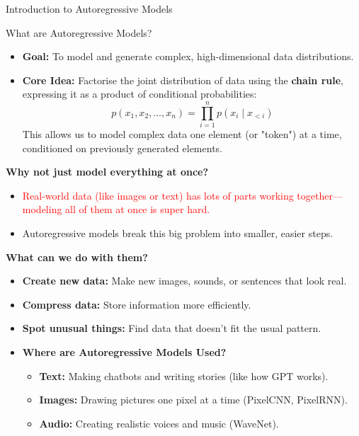\begin{frame}[allowframebreaks]{}
    \centering
    \LARGE Introduction to Autoregressive Models
\end{frame}

\begin{frame}[allowframebreaks]{What are Autoregressive Models?}
    \begin{itemize}
        \item \textbf{Goal:} To model and generate complex, high-dimensional data distributions.
        \item \textbf{Core Idea:} Factorise the joint distribution of data using the \textbf{chain rule}, expressing it as a product of conditional probabilities:
        \[
        p(x_1, x_2, \ldots, x_n) = \prod_{i=1}^n p(x_i \mid x_{<i})
        \]
        This allows us to model complex data one element (or "token") at a time, conditioned on previously generated elements.
    \end{itemize}

    \framebreak
    
    \textbf{Why not just model everything at once?}
        \begin{itemize}
            \item \textcolor{red}{Real-world data (like images or text) has lots of parts working together—modeling all of them at once is super hard.}
            \item \textcolor[rgb]{0,0.5,0}{Autoregressive models break this big problem into smaller, easier steps.}
        \end{itemize}
    \vspace{2em}
    \textbf{What can we do with them?}
        \begin{itemize}
            \item \textbf{Create new data:} Make new images, sounds, or sentences that look real.
            \item \textbf{Compress data:} Store information more efficiently.
            \item \textbf{Spot unusual things:} Find data that doesn’t fit the usual pattern.
        \end{itemize}

    \framebreak

    \begin{itemize}
        \item \textbf{Where are Autoregressive Models Used?}
            \begin{itemize}
                \item \textbf{Text:} Making chatbots and writing stories (like how GPT works).
                \item \textbf{Images:} Drawing pictures one pixel at a time (PixelCNN, PixelRNN).
                \item \textbf{Audio:} Creating realistic voices and music (WaveNet).
            \end{itemize}
    \end{itemize}
\end{frame}